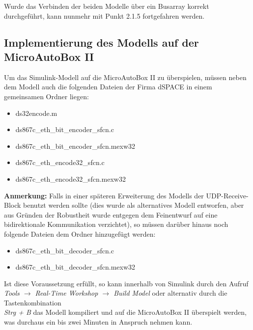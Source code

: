 \documentclass[fontsize = 12pt, paper = a4]{scrreprt}
\begin{document}
Wurde das Verbinden der beiden Modelle über ein Busarray korrekt durchgeführt, kann nunmehr mit Punkt 2.1.5 fortgefahren werden.



\subsection{Implementierung des Modells auf der MicroAutoBox II}

Um das Simulink-Modell auf die MicroAutoBox II zu überspielen, müssen neben dem Modell auch die folgenden Dateien der Firma dSPACE in einem gemeinsamen Ordner liegen: 

\begin{itemize}

\item ds32encode.m
\item ds867c\_eth\_bit\_encoder\_sfcn.c
\item ds867c\_eth\_bit\_encoder\_sfcn.mexw32
\item ds867c\_eth\_encode32\_sfcn.c
\item ds867c\_eth\_encode32\_sfcn.mexw32

\end{itemize}

\textbf{Anmerkung:} Falls in einer späteren Erweiterung des Modells der UDP-Receive-Block benutzt werden sollte (dies wurde als alternatives Modell entworfen, aber aus Gründen der Robustheit wurde entgegen dem Feinentwurf auf eine bidirektionale Kommunikation verzichtet), so müssen darüber hinaus noch folgende Dateien dem Ordner hinzugefügt werden:

\begin{itemize}


\item ds867c\_eth\_bit\_decoder\_sfcn.c
\item ds867c\_eth\_bit\_decoder\_sfcn.mexw32

\end{itemize}

Ist diese Voraussetzung erfüllt, so kann innerhalb von Simulink durch den Aufruf \\ \textit{Tools $\rightarrow$ Real-Time Workshop $\rightarrow$ Build Model} oder alternativ durch die Tastenkombination  \\ \textit{Strg + B} das Modell kompiliert und auf die MicroAutoBox II überspielt werden, was durchaus ein bis zwei Minuten in Anspruch nehmen kann. \\
\end{document}

